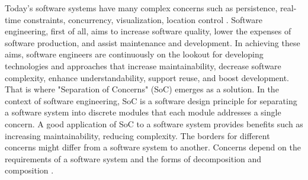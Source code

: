 Today's software systems have many complex concerns such as persistence, real-time constraints, concurrency, visualization, location control \cite{27}. Software engineering, first of all, aims to increase software quality, lower the expenses of software production, and assist maintenance and development. In achieving these aims, software engineers are continuously on the lookout for developing technologies and approaches that increase maintainability, decrease software complexity, enhance understandability, support reuse, and boost development. That is where "Separation of Concerns" (SoC) emerges as a solution. In the context of software engineering, SoC is a software design principle for separating a software system into discrete modules that each module addresses a single concern. A good application of SoC to a software system provides benefits such as increasing maintainability, reducing complexity. The borders for different concerns might differ from a software system to another. Concerns depend on the requirements of a software system and the forms of decomposition and composition \cite{28}.